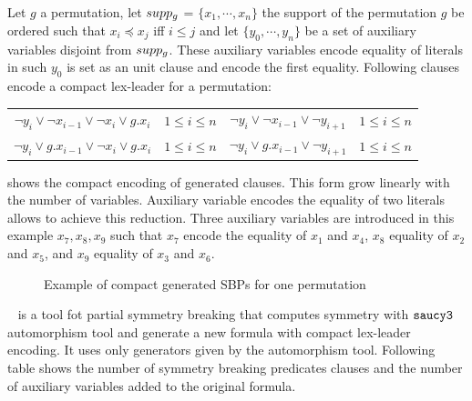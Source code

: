  Let $g$ a permutation, let $supp_g$ = $\{x_1, \cdots, x_n\}$ the support of the permutation $g$ be ordered 
 such that $x_i \preceq x_j$ iff $i \leq j$  and let $\{y_0,\cdots, y_{n} \}$ be a set of auxiliary variables
 disjoint from $supp_g$. These auxiliary variables encode equality of literals in such $y_0$ is set as an unit clause
 and encode the first equality.
 Following clauses encode a compact lex-leader for a permutation:
 

\begin{center}
\begin{tabular}{cc|cc}
	$\neg y_i \lor \neg x_{i-1} \lor \neg x_i \lor g.x_i$ & $1 \leq i \leq n$ & $ \neg y_i \lor \neg x_{i-1} \lor \neg y_{i+1}$ & $1 \leq i \leq n$ \\
	$\neg y_i \lor  g.x_{i-1} \lor \neg x_i \lor g.x_i$ & $1 \leq i \leq n$ & $ \neg y_i \lor g.x_{i-1} \lor \neg y_{i+1}$ & $1 \leq i \leq n$ \\
	
\end{tabular}
\end{center}



 shows the compact encoding of generated clauses. This form grow linearly with the number of variables.
Auxiliary variable encodes the equality of two literals allows to achieve this reduction. Three auxiliary variables are introduced
in this example $x_7, x_8, x_9$ such that $x_7$ encode the equality of $x_1$ and $x_4$, $x_8$ equality of $x_2$ and $x_5$, and $x_9$ equality of $x_3$ and $x_6$.

 \begin{figure}[!htbp]
	
	\caption{Example of compact generated SBPs for one permutation}
	\label{fig:esbp_compact_gen}
\end{figure}


\shatter~\cite{aloul06} is a tool fot partial symmetry breaking that computes symmetry with $\texttt{saucy3}$ automorphism tool and generate a new formula with compact lex-leader encoding. It uses only generators given by the automorphism tool. Following table shows the number of symmetry breaking predicates clauses and the
number of auxiliary variables added to the original formula.







%



